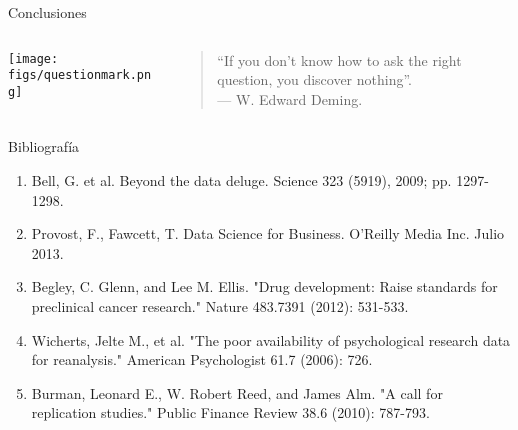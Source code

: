\begin{frame}{Conclusiones}
 \begin{columns}[T]
    \begin{column}{.5\textwidth}
    \texttt{[image: figs/questionmark.png]}
    \end{column}
    \begin{column}{.5\textwidth}
    \vspace*{1.5cm}
    \hspace*{-1cm}
    \begin{quotation}
     ``If you don't know how to ask the right question, you discover nothing''.\\
     — W. Edward Deming.
    \end{quotation}

    \end{column}
  \end{columns}

\end{frame}


\begin{frame}{Bibliografía}
\begin{enumerate}
 \item Bell, G. et al. Beyond the data deluge. Science 323 (5919), 2009; pp. 1297-1298.
 \item Provost, F., Fawcett, T. Data Science for Business. O'Reilly Media Inc. Julio 2013.
 \item Begley, C. Glenn, and Lee M. Ellis. "Drug development: Raise standards 
 for preclinical cancer research." Nature 483.7391 (2012): 531-533.
 \item Wicherts, Jelte M., et al. "The poor availability of psychological 
 research data for reanalysis." American Psychologist 61.7 (2006): 726.
 \item Burman, Leonard E., W. Robert Reed, and James Alm. "A call for replication 
 studies." Public Finance Review 38.6 (2010): 787-793.
\end{enumerate}
\end{frame}


